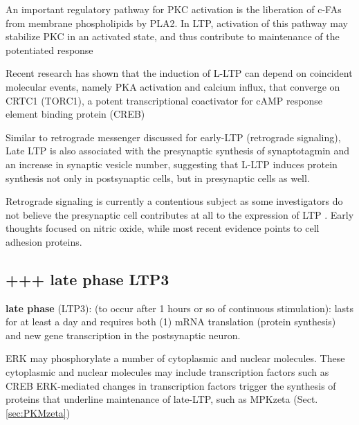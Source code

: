 An important regulatory pathway for PKC activation is the liberation of c-FAs
from membrane phospholipids by PLA2. In LTP, activation of this pathway may
stabilize PKC in an activated state, and thus contribute to maintenance of the
potentiated response
  
  Recent research has shown that the induction of L-LTP can depend on coincident
  molecular events, namely PKA activation and calcium influx, that converge on
  CRTC1 (TORC1), a potent transcriptional coactivator for cAMP response element
  binding protein (CREB)
  
  Similar to retrograde messenger discussed for early-LTP (retrograde
  signaling), Late LTP is also associated with the presynaptic synthesis of synaptotagmin and an increase in
  synaptic vesicle number, suggesting that L-LTP induces protein synthesis not
  only in postsynaptic cells, but in presynaptic cells as well.
  
  Retrograde signaling is currently a contentious subject as some investigators
  do not believe the presynaptic cell contributes at all to the expression of LTP
  \citep{malenka2004}.
Early thoughts focused on nitric oxide, while most recent evidence points to
cell adhesion proteins.

\subsection{+++ late phase LTP3}

{\bf late phase} (LTP3): (to occur after 1
  hours or so of continuous stimulation):   lasts for at least a day and
  requires both (1) mRNA translation (protein synthesis) and new gene
  transcription in the postsynaptic neuron.
  
  ERK may phosphorylate a number of cytoplasmic and nuclear molecules.
  These cytoplasmic and nuclear molecules may include transcription factors such
   as CREB
   ERK-mediated changes in transcription factors trigger the synthesis of
   proteins that underline maintenance of late-LTP, such as MPKzeta
   (Sect.\ref{sec:PKMzeta})
  
